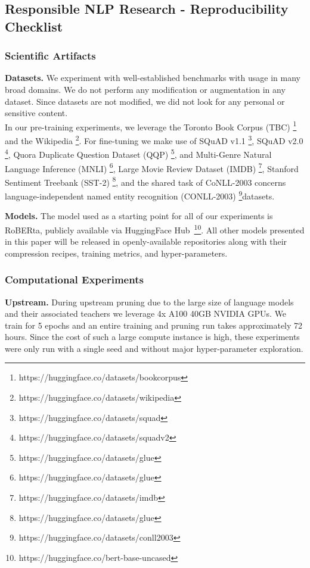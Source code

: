 \subsection{Responsible NLP Research - Reproducibility Checklist}
\subsubsection{Scientific Artifacts}
\noindent\textbf{Datasets.} We experiment with well-established benchmarks with usage in many broad domains. We do not perform any modification or augmentation in any dataset. Since datasets are not modified, we did not look for any personal or sensitive content. \\
In our pre-training experiments, we leverage the Toronto Book Corpus (TBC) \cite{Zhu2015AligningBA}\footnote{https://huggingface.co/datasets/bookcorpus} and the Wikipedia \cite{wikidump}\footnote{https://huggingface.co/datasets/wikipedia}. 
For fine-tuning we make use of SQuAD v1.1 \cite{Rajpurkar2016SQuAD1Q} \footnote{https://huggingface.co/datasets/squad}, SQuAD v2.0 \cite{Rajpurkar2018KnowWY} \footnote{https://huggingface.co/datasets/squadv2}, 
Quora Duplicate Question Dataset (QQP) \cite{Shankar2017IdentifyingQQ}\footnote{https://huggingface.co/datasets/glue}, and Multi-Genre Natural Language Inference (MNLI) \cite{N18-1101} \footnote{ https://huggingface.co/datasets/glue},  Large Movie Review Dataset (IMDB) \cite{maas-EtAl:2011:ACL-HLT2011}\footnote{ https://huggingface.co/datasets/imdb}, Stanford Sentiment Treebank (SST-2) \cite{socher-etal-2013-recursive}\footnote{ https://huggingface.co/datasets/glue}, and the shared task of CoNLL-2003 concerns language-independent named entity recognition (CONLL-2003) \cite{tjong-kim-sang-de-meulder-2003-introduction}\footnote{ https://huggingface.co/datasets/conll2003}datasets.

\noindent\textbf{Models.} The model used as a starting point for all of our experiments is RoBERta, publicly available via HuggingFace Hub~\footnote{https://huggingface.co/bert-base-uncased}. All other models presented in this paper will be released in openly-available repositories along with their compression recipes, training metrics, and hyper-parameters.

\subsubsection{Computational Experiments}
\textbf{Upstream.} During upstream pruning due to the large size of language models and their associated teachers we leverage 4x A100 40GB NVIDIA GPUs. We train for 5 epochs and an entire training and pruning run takes approximately 72 hours. Since the cost of such a large compute instance is high, these experiments were only run with a single seed and without major hyper-parameter exploration.

